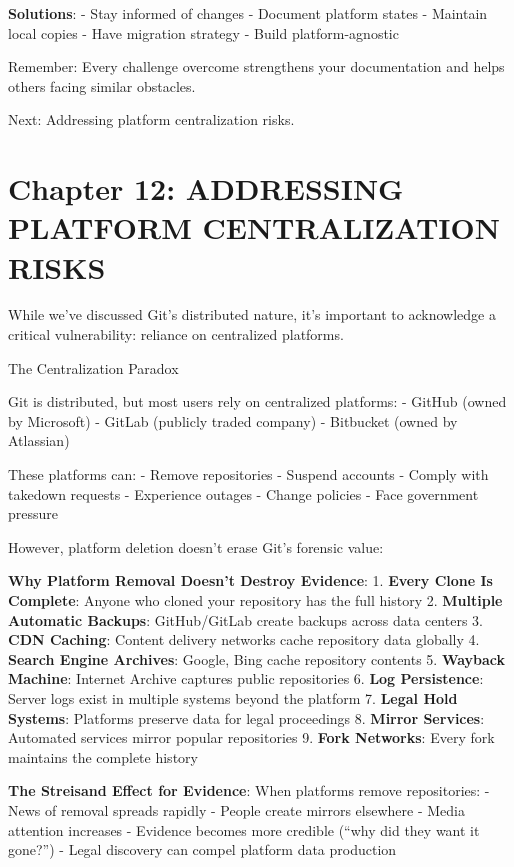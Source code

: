 \textbf{Solutions}: - Stay informed of changes - Document platform
states - Maintain local copies - Have migration strategy - Build
platform-agnostic

Remember: Every challenge overcome strengthens your documentation and
helps others facing similar obstacles.

Next: Addressing platform centralization risks.

\section{Chapter 12: ADDRESSING PLATFORM CENTRALIZATION
RISKS}\label{chapter-12-addressing-platform-centralization-risks}

While we've discussed Git's distributed nature, it's important to
acknowledge a critical vulnerability: reliance on centralized platforms.

The Centralization Paradox

Git is distributed, but most users rely on centralized platforms: -
GitHub (owned by Microsoft) - GitLab (publicly traded company) -
Bitbucket (owned by Atlassian)

These platforms can: - Remove repositories - Suspend accounts - Comply
with takedown requests - Experience outages - Change policies - Face
government pressure

However, platform deletion doesn't erase Git's forensic value:

\textbf{Why Platform Removal Doesn't Destroy Evidence}: 1. \textbf{Every
Clone Is Complete}: Anyone who cloned your repository has the full
history 2. \textbf{Multiple Automatic Backups}: GitHub/GitLab create
backups across data centers 3. \textbf{CDN Caching}: Content delivery
networks cache repository data globally 4. \textbf{Search Engine
Archives}: Google, Bing cache repository contents 5. \textbf{Wayback
Machine}: Internet Archive captures public repositories 6. \textbf{Log
Persistence}: Server logs exist in multiple systems beyond the platform
7. \textbf{Legal Hold Systems}: Platforms preserve data for legal
proceedings 8. \textbf{Mirror Services}: Automated services mirror
popular repositories 9. \textbf{Fork Networks}: Every fork maintains the
complete history

\textbf{The Streisand Effect for Evidence}: When platforms remove
repositories: - News of removal spreads rapidly - People create mirrors
elsewhere - Media attention increases - Evidence becomes more credible
(``why did they want it gone?'') - Legal discovery can compel platform
data production

